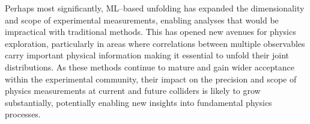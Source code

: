     Perhaps most significantly, ML--based unfolding has expanded the dimensionality and scope of experimental measurements, enabling analyses that would be impractical with traditional methods.
    This has opened new avenues for physics exploration, particularly in areas where correlations between multiple observables carry important physical information making it essential to unfold their joint distributions.
    As these methods continue to mature and gain wider acceptance within the experimental community, their impact on the precision and scope of physics measurements at current and future colliders is likely to grow substantially, potentially enabling new insights into fundamental physics processes.